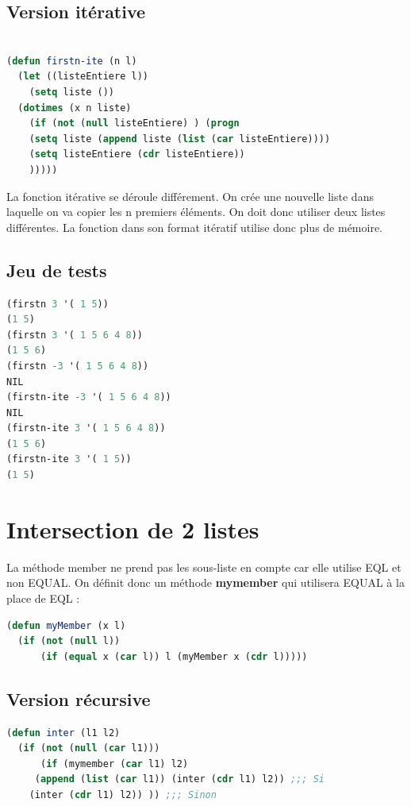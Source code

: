 \documentclass[a4paper,10pt]{report}
\begin{document}
    \subsection{Version itérative}
  \begin{lstlisting}[language=Lisp]
    
(defun firstn-ite (n l)
  (let ((listeEntiere l))
    (setq liste ())
  (dotimes (x n liste)
    (if (not (null listeEntiere) ) (progn 
    (setq liste (append liste (list (car listeEntiere))))
    (setq listeEntiere (cdr listeEntiere))
    )))))

  \end{lstlisting}
  
  La fonction itérative se déroule différement. On crée une nouvelle liste dans laquelle on va copier les n premiers éléments. 
  On doit donc utiliser deux listes différentes. La fonction dans son format itératif utilise donc plus de mémoire. 
  
	  \subsection{Jeu de tests}
	  	\begin{lstlisting}[language=Lisp]
(firstn 3 '( 1 5))
(1 5)
(firstn 3 '( 1 5 6 4 8))
(1 5 6)
(firstn -3 '( 1 5 6 4 8))
NIL
(firstn-ite -3 '( 1 5 6 4 8))
NIL
(firstn-ite 3 '( 1 5 6 4 8))
(1 5 6)
(firstn-ite 3 '( 1 5))
(1 5)
		 \end{lstlisting}

    \newpage
    \section{Intersection de 2 listes}
    
    La méthode member ne prend pas les sous-liste en compte car elle utilise EQL et non EQUAL. On définit donc un méthode \textbf{mymember} qui utilisera EQUAL à la place de EQL :
\begin{lstlisting}[language=Lisp]
(defun myMember (x l)
  (if (not (null l))
      (if (equal x (car l)) l (myMember x (cdr l)))))
\end{lstlisting}
    
    
      \subsection{Version récursive}
	\begin{lstlisting}[language=Lisp]
(defun inter (l1 l2)
  (if (not (null (car l1)))
      (if (mymember (car l1) l2)
	 (append (list (car l1)) (inter (cdr l1) l2)) ;;; Si
	(inter (cdr l1) l2)) )) ;;; Sinon
	
	
	\end{lstlisting}
\end{document}
